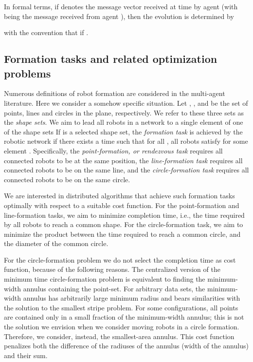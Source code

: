 \documentclass[onecolumn,journal,letterpaper]{IEEEtran}
\newcommand\oprocendsymbol{\hbox{}}
\newcommand\oprocend{\relax\ifmmode\else\unskip\hfill\fi\oprocendsymbol}
\begin{document}
In formal terms, if  denotes the message vector received
at time  by agent  (with  being the message
received from agent ), then the evolution is determined by

with the convention that  if
.


\subsection{Formation tasks and related optimization problems}
\label{sec:mintime-formation_optimal-formation}
Numerous definitions of robot formation are considered in the multi-agent
literature. Here we consider a somehow specific situation.  Let
, , and  be the
set of points, lines and circles in the plane, respectively. We refer to
these three sets as the \emph{shape sets}.  We aim to lead all robots in a
network to a single element of one of the shape sets If  is a selected
shape set, the \emph{formation task} is achieved by the robotic network if
there exists a time  such that for all , all robots
 satisfy  for some element .
Specifically, the \emph{point-formation, or rendezvous task} requires all
connected robots to be at the same position, the \emph{line-formation task}
requires all connected robots to be on the same line, and the
\emph{circle-formation task} requires all connected robots to be on the
same circle.

We are interested in distributed algorithms that achieve such formation
tasks optimally with respect to a suitable cost function. For the
point-formation and line-formation tasks, we aim to minimize completion
time, i.e., the time required by all robots to reach a common shape.  For
the circle-formation task, we aim to minimize the product between the time
required to reach a common circle, and the diameter of the common circle.



\begin{remark} For the circle-formation problem we do not
  select the completion time as cost function, because of the following
  reasons. The centralized version of the minimum time circle-formation
  problem is equivalent to finding the minimum-width annulus containing the
  point-set. For arbitrary data sets, the minimum-width annulus has
  arbitrarily large minimum radius and bears similarities with the solution
  to the smallest stripe problem.  For some configurations, all points are
  contained only in a small fraction of the minimum-width annulus; this is
  not the solution we envision when we consider moving robots in a circle
  formation.  Therefore, we consider, instead, the smallest-area
  annulus. This cost function penalizes both the difference of the radiuses
  of the annulus (width of the annulus) and their sum.  \oprocend
\end{remark}
\end{document}
